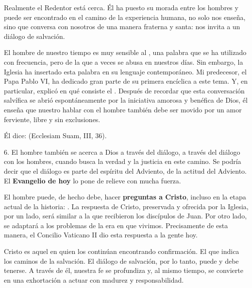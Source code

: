 Realmente el Redentor está cerca. Él ha puesto su morada entre los hombres y puede ser encontrado en el camino de la experiencia humana, no solo nos enseña, sino que conversa con nosotros de una manera fraterna y santa: nos invita a un diálogo de salvación.

El hombre de nuestro tiempo es muy sensible al , una palabra que se ha utilizado con frecuencia, pero de la que a veces se abusa en nuestros días. Sin embargo, la Iglesia ha insertado esta palabra en su lenguaje contemporáneo. Mi predecesor, el Papa Pablo VI, ha dedicado gran parte de su primera encíclica a este tema. Y, en particular, explicó en qué consiste el . Después de recordar que esta conversación salvífica se abrió espontáneamente por la iniciativa amorosa y benéfica de Dios, él enseña que nuestro hablar con el hombre también debe ser movido por un amor ferviente, libre y sin exclusiones.

Él dice:  (Ecclesiam Suam, III, 36).

6. El hombre también se acerca a Dios a través del diálogo, a través del diálogo con los hombres, cuando busca la verdad y la justicia en este camino. Se podría decir que el diálogo es parte del espíritu del Adviento, de la actitud del Adviento. El \textbf{Evangelio de hoy} lo pone de relieve con mucha fuerza.

El hombre puede, de hecho debe, hacer \textbf{preguntas a Cristo}, incluso en la etapa actual de la historia: . La respuesta de Cristo, preservada y ofrecida por la Iglesia, por un lado, será similar a la que recibieron los discípulos de Juan. Por otro lado, se adaptará a los problemas de la era en que vivimos. Precisamente de esta manera, el Concilio Vaticano II dio esta respuesta a la gente hoy.

Cristo es aquel en quien los  continúan encontrando confirmación. El que indica los caminos de la salvación. El diálogo de salvación, por lo tanto, puede y debe tenerse. A través de él, nuestra fe se profundiza y, al mismo tiempo, se convierte en una exhortación a actuar con madurez y responsabilidad.

